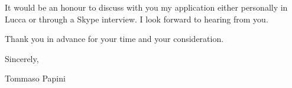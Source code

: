 \documentclass{article}
\begin{document}
    It would be an honour to discuss with you my application either personally in Lucca or through a Skype interview. I look forward to hearing from you. \par \bigskip
    
    Thank you in advance for your time and your consideration. \par \bigskip
    
    Sincerely, \par \medskip
    
    \qquad \qquad Tommaso Papini
\end{document}
